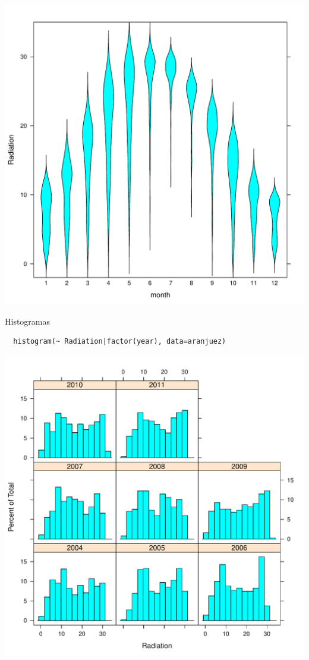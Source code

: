 \documentclass[xcolor={usenames,svgnames,dvipsnames}]{beamer}
\begin{document}
\begin{frame}[label=sec-2-1-43]{}
\includegraphics[width=.9\linewidth]{figs/violin.pdf}
\end{frame}


\begin{frame}[fragile,label=sec-2-1-44]{Histogramas}
 \lstset{language=R,label= ,caption= ,numbers=none}
\begin{lstlisting}
  histogram(~ Radiation|factor(year), data=aranjuez)
\end{lstlisting}
\end{frame}

\begin{frame}[label=sec-2-1-45]{}
\includegraphics[width=.9\linewidth]{figs/histogram.pdf}
\end{frame}
\end{document}
